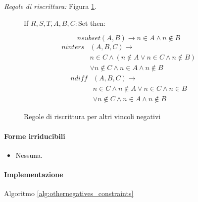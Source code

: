 \documentclass[12pt,a4paper,openright]{book} %
\begin{document}
\noindent\textit{Regole di riscrittura:} Figura \ref{fig:othernegatives_constraints}.

\begin{figure}
	\begin{tcolorbox}[colframe=black, colback=white, sharp corners]
		\setcounter{equation}{0}
		\renewcommand{\theequation}{\arabic{equation}}
		
		If $R, S, T, A, B, C: \text{Set}$ then:
		
		\begin{equation}
		nsubset(A,B) \to n \in A \land n \not\in B
		\end{equation}
		\begin{equation}
		\begin{split}
		ninters& (A,B,C) \to \\
		  & n \in C \land ( n \not\in A \lor n \in C \land n \not\in B ) \\
		  & \lor n \not\in C \land n \in A \land n \not\in B
		\end{split}
		\end{equation}
		\begin{equation}
		\begin{split}
		ndiff& (A,B,C) \to \\
		  & n \in C \land n \not\in A \lor n \in C \land n \in B \\
		  & \lor n \not\in C \land n \in A \land n \not\in B
		\end{split}
		\end{equation}
		
	\end{tcolorbox}
	
	\caption{Regole di riscrittura per altri vincoli negativi}
	\label{fig:othernegatives_constraints}
\end{figure}

\paragraph{Forme irriducibili}
\begin{itemize}
	\item Nessuna.
\end{itemize}

\paragraph{Implementazione}
Algoritmo \ref{alg:othernegatives_constraints}
\end{document}
